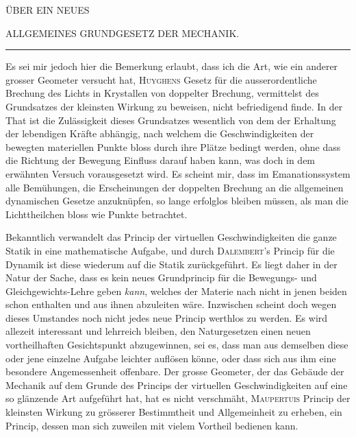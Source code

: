 \begin{center}
ÜBER EIN NEUES\par
\bigskip
ALLGEMEINES GRUNDGESETZ DER MECHANIK.\par
\medskip
\rule{.16\textwidth}{.3pt}
\end{center}
\expandafter\def\csname HistoricalNoteText2\endcsname{Es sei mir jedoch hier die Bemerkung erlaubt, dass ich die Art, wie ein anderer grosser Geometer versucht hat, \textsc{Huyghens} Gesetz für die ausserordentliche Brechung des Lichts in Krystallen von doppelter Brechung, vermittelst des Grundsatzes der kleinsten Wirkung zu beweisen, nicht befriedigend finde. In der That ist die Zulässigkeit dieses Grundsatzes wesentlich von dem der Erhaltung der lebendigen Kräfte abhängig, nach welchem die Geschwindigkeiten der bewegten materiellen Punkte bloss durch ihre Plätze bedingt werden, ohne dass die Richtung der Bewegung Einfluss darauf haben kann, was doch in dem erwähnten Versuch vorausgesetzt wird. Es scheint mir, dass im Emanationssystem alle Bemühungen, die Erscheinungen der doppelten Brechung an die allgemeinen dynamischen Gesetze anzuknüpfen, so lange erfolglos bleiben müssen, als man die Lichttheilchen bloss wie Punkte betrachtet.}
\par
Bekanntlich verwandelt das Princip der virtuellen Geschwindigkeiten die ganze Statik in eine mathematische Aufgabe, und durch \textsc{Dalembert}’s Princip für die Dynamik ist diese wiederum auf die Statik zurückgeführt. Es liegt daher in der Natur der Sache, dass es kein neues Grundprincip für die Bewegungs- und Gleichgewichts-Lehre geben \textit{kann}, welches der Materie nach nicht in jenen beiden schon enthalten und aus ihnen abzuleiten wäre. Inzwischen scheint doch wegen dieses Umstandes noch nicht jedes neue Princip werthlos zu werden. Es wird allezeit interessant und lehrreich bleiben, den Naturgesetzen einen neuen vortheilhaften Gesichtspunkt abzugewinnen, sei es, dass man aus demselben diese oder jene einzelne Aufgabe leichter auflösen könne, oder dass sich aus ihm eine besondere Angemessenheit offenbare. Der grosse Geometer, der das Gebäude der Mechanik auf dem Grunde des Princips der virtuellen Geschwindigkeiten auf eine so glänzende Art aufgeführt hat, hat es nicht verschmäht, \textsc{Maupertuis} Princip der kleinsten Wirkung zu grösserer Bestimmtheit und Allgemeinheit zu erheben, ein Princip, dessen man sich zuweilen mit vielem Vortheil bedienen kann.
